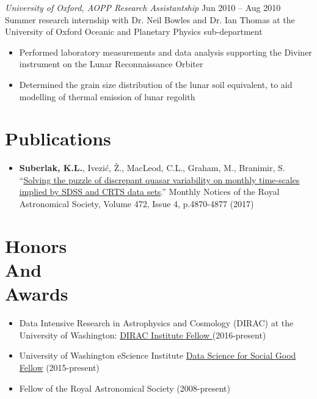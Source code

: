 \documentclass[margin]{res}
\begin{document}
\begin{resume}
{\sl University of Oxford, AOPP Research Assistantship} \hfill            Jun 2010 -- Aug 2010 \\
Summer research internship with Dr. Neil Bowles and Dr. Ian Thomas  at the University of Oxford Oceanic and Planetary Physics sub-department
\begin{itemize}%
\item Performed laboratory measurements and data analysis supporting the Diviner instrument on the Lunar Reconnaissance Orbiter
\item Determined the grain size distribution of the lunar soil equivalent, to aid modelling of thermal emission of lunar regolith
\end{itemize}  




\section{Publications}
\begin{itemize}   
\item \textbf{Suberlak, K.L.}, Ivezi\'c, \v{Z}., MacLeod, C.L., Graham, M., Branimir, S. ``\href{https://doi.org/10.1093/mnras/stx2310}{Solving the puzzle of discrepant quasar variability on monthly time-scales implied by SDSS and CRTS data sets}.'' Monthly Notices of the Royal Astronomical Society, Volume 472, Issue 4, p.4870-4877 (2017)

\end{itemize}


\section{Honors\\And\\Awards} 
\begin{itemize}  

\item Data Intensive Research in Astrophysics and Cosmology (DIRAC) at the University of Washington: \href{https://dirac.astro.washington.edu}{DIRAC Institute Fellow }(2016-present) 
\item University of Washington eScience Institute \href{https://escience.washington.edu/dssg/}{Data Science for Social Good Fellow} (2015-present)
\item Fellow of the Royal Astronomical Society (2008-present) \\
\end{itemize}
                 



\end{resume}
\end{document}
